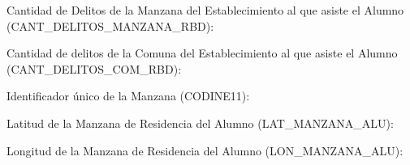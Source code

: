 \begin{longdescription}
\begin{longdescription}
        \item[Cantidad de Delitos de la Manzana del Establecimiento al que asiste el Alumno](CANT\_DELITOS\_MANZANA\_RBD):
        \item[Cantidad de delitos de la Comuna del Establecimiento al que asiste el Alumno](CANT\_DELITOS\_COM\_RBD):
        \item[Identificador único de la Manzana](CODINE11):
        \item[Latitud de la Manzana de Residencia del Alumno](LAT\_MANZANA\_ALU):
        \item[Longitud de la Manzana de Residencia del Alumno](LON\_MANZANA\_ALU):
    \end{longdescription}
\end{longdescription}